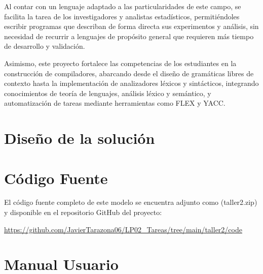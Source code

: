 \documentclass{article}
\begin{document}
Al contar con un lenguaje adaptado a las particularidades de este campo, se facilita la tarea de los investigadores y analistas estadísticos, permitiéndoles escribir programas que describan de forma directa sus experimentos y análisis, sin necesidad de recurrir a lenguajes de propósito general que requieren más tiempo de desarrollo y validación.

Asimismo, este proyecto fortalece las competencias de los estudiantes en la construcción de compiladores, abarcando desde el diseño de gramáticas libres de contexto hasta la implementación de analizadores léxicos y sintácticos, integrando conocimientos de teoría de lenguajes, análisis léxico y semántico, y automatización de tareas mediante herramientas como FLEX y YACC.


\section{Diseño de la solución}\label{sec:dis}



\section{Código Fuente}\label{sec:cod}

El código fuente completo de este modelo se encuentra adjunto como 
(taller2.zip)
y disponible en el repositorio GitHub del proyecto:

\begin{center}
\url{https://github.com/JavierTarazona06/LP02_Tareas/tree/main/taller2/code}
\end{center}


\section{Manual Usuario}\label{sec:man_u}
\end{document}
